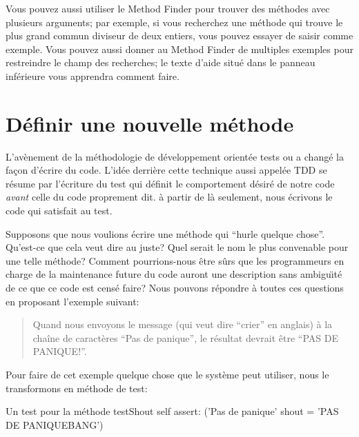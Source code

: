 \documentclass[a4paper,10pt,twoside]{book}
\begin{document}
Vous pouvez aussi utiliser le Method Finder pour trouver des
méthodes avec plusieurs arguments; par exemple, si vous recherchez
une méthode qui trouve le plus grand commun diviseur de deux
entiers, vous pouvez essayer de saisir  comme exemple.
Vous pouvez aussi donner au Method Finder de multiples exemples pour
restreindre le champ des recherches; le texte d'aide situé dans le
panneau inférieure vous apprendra comment faire. %

\section{Définir une nouvelle méthode}
L'avènement de la méthodologie de développement orientée tests
ou \cite{Beck03a} a changé la
façon d'écrire du code.
L'idée derrière cette technique aussi appelée TDD se résume par l'écriture
du test qui définit le comportement désiré de notre
code \emph{avant} celle du code proprement dit.
à partir de là seulement, nous écrivons le code qui satisfait au test.


Supposons que nous voulions écrire une méthode qui ``hurle quelque
chose''. Qu'est-ce que cela veut dire au juste? Quel serait le nom
le plus convenable pour une telle méthode? Comment pourrions-nous
être sûrs que les programmeurs en charge de la maintenance future
du code auront une description sans ambigu\"{\i}té de ce que ce code
est censé faire?
Nous pouvons répondre à toutes ces questions en proposant
l'exemple suivant:

\begin{quote}
Quand nous envoyons le message  (qui veut dire ``crier'' en anglais)
à la chaîne de caractères ``Pas de panique'', le résultat
devrait être ``PAS DE PANIQUE!''.
\end{quote}

\noindent
Pour faire de cet exemple quelque chose que le système peut
utiliser, nous le transformons en méthode de test:

\begin{method}[testShout]{Un test pour la méthode }
testShout
	self assert: ('Pas de panique' shout = 'PAS DE PANIQUEBANG')
\end{method} %
\end{document}
